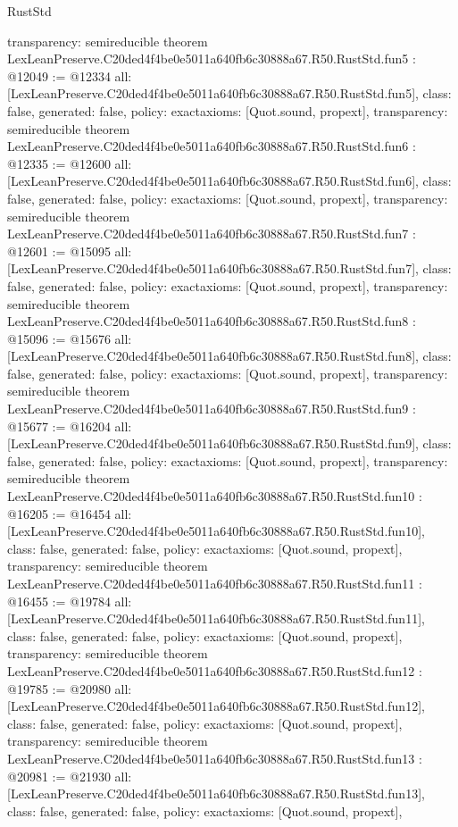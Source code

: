 \begin{lexlean}{RustStd}
\begin{coremodule}
{  transparency: semireducible
}
theorem LexLeanPreserve.C20ded4f4be0e5011a640fb6c30888a67.R50.RustStd.fun5 : @12049 := @12334 {
  all: [LexLeanPreserve.C20ded4f4be0e5011a640fb6c30888a67.R50.RustStd.fun5],
  class: false,
  generated: false,
  policy: exact{axioms: [Quot.sound, propext]},
  transparency: semireducible
}
theorem LexLeanPreserve.C20ded4f4be0e5011a640fb6c30888a67.R50.RustStd.fun6 : @12335 := @12600 {
  all: [LexLeanPreserve.C20ded4f4be0e5011a640fb6c30888a67.R50.RustStd.fun6],
  class: false,
  generated: false,
  policy: exact{axioms: [Quot.sound, propext]},
  transparency: semireducible
}
theorem LexLeanPreserve.C20ded4f4be0e5011a640fb6c30888a67.R50.RustStd.fun7 : @12601 := @15095 {
  all: [LexLeanPreserve.C20ded4f4be0e5011a640fb6c30888a67.R50.RustStd.fun7],
  class: false,
  generated: false,
  policy: exact{axioms: [Quot.sound, propext]},
  transparency: semireducible
}
theorem LexLeanPreserve.C20ded4f4be0e5011a640fb6c30888a67.R50.RustStd.fun8 : @15096 := @15676 {
  all: [LexLeanPreserve.C20ded4f4be0e5011a640fb6c30888a67.R50.RustStd.fun8],
  class: false,
  generated: false,
  policy: exact{axioms: [Quot.sound, propext]},
  transparency: semireducible
}
theorem LexLeanPreserve.C20ded4f4be0e5011a640fb6c30888a67.R50.RustStd.fun9 : @15677 := @16204 {
  all: [LexLeanPreserve.C20ded4f4be0e5011a640fb6c30888a67.R50.RustStd.fun9],
  class: false,
  generated: false,
  policy: exact{axioms: [Quot.sound, propext]},
  transparency: semireducible
}
theorem LexLeanPreserve.C20ded4f4be0e5011a640fb6c30888a67.R50.RustStd.fun10 : @16205 := @16454 {
  all: [LexLeanPreserve.C20ded4f4be0e5011a640fb6c30888a67.R50.RustStd.fun10],
  class: false,
  generated: false,
  policy: exact{axioms: [Quot.sound, propext]},
  transparency: semireducible
}
theorem LexLeanPreserve.C20ded4f4be0e5011a640fb6c30888a67.R50.RustStd.fun11 : @16455 := @19784 {
  all: [LexLeanPreserve.C20ded4f4be0e5011a640fb6c30888a67.R50.RustStd.fun11],
  class: false,
  generated: false,
  policy: exact{axioms: [Quot.sound, propext]},
  transparency: semireducible
}
theorem LexLeanPreserve.C20ded4f4be0e5011a640fb6c30888a67.R50.RustStd.fun12 : @19785 := @20980 {
  all: [LexLeanPreserve.C20ded4f4be0e5011a640fb6c30888a67.R50.RustStd.fun12],
  class: false,
  generated: false,
  policy: exact{axioms: [Quot.sound, propext]},
  transparency: semireducible
}
theorem LexLeanPreserve.C20ded4f4be0e5011a640fb6c30888a67.R50.RustStd.fun13 : @20981 := @21930 {
  all: [LexLeanPreserve.C20ded4f4be0e5011a640fb6c30888a67.R50.RustStd.fun13],
  class: false,
  generated: false,
  policy: exact{axioms: [Quot.sound, propext]},
}
\end{coremodule}
\end{lexlean}
